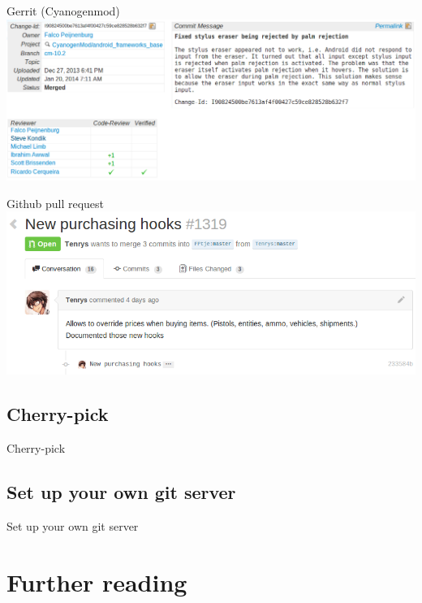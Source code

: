 \documentclass[10pt,a4paper]{beamer}
\begin{document}
\begin{frame}{Gerrit (Cyanogenmod)}
\includegraphics[width=\linewidth]{gerrit.png}
\end{frame}

\begin{frame}{Github pull request}
\includegraphics[width=\linewidth]{githubpull.png}
\end{frame}

\subsection{Cherry-pick}
\begin{frame}{Cherry-pick}

\end{frame}

\subsection{Set up your own git server}
\begin{frame}{Set up your own git server}

\end{frame}

\section{Further reading}
\begin{frame}

\end{frame}
\end{document}
